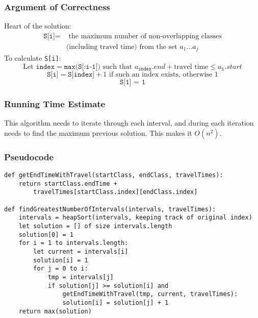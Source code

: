 \documentclass{math}
\begin{document}
\subsubsection*{Argument of Correctness}
Heart of the solution:
\begin{align*}
  \texttt{S[i]} =& \text{ the maximum number of non-overlapping classes} \\
  & \text{(including travel time) from the set } a_{1}\dots a_{j}
\end{align*}
To calculate \texttt{S[i]}:
\[ \text{Let } \texttt{index} = \texttt{max(S[:i-1])} \text{ such that }
  a_{\texttt{index}}.end + \text{travel time} \le a_{\texttt{i}}.start \]
\[ \texttt{S[i]} = \texttt{S[index]} + 1 \text{ if such an index exists,
  otherwise } 1 \]
\[ \texttt{S[1] = 1} \]

\subsubsection*{Running Time Estimate}
This algorithm needs to iterate through each interval, and during each
iteration needs to find the maximum previous solution. This makes it
\( O(n^2) \).

\subsubsection*{Pseudocode}
\begin{lstlisting}
def getEndTimeWithTravel(startClass, endClass, travelTimes):
    return startClass.endTime +
        travelTimes[startClass.index][endClass.index]

def findGreatestNumberOfIntervals(intervals, travelTimes):
    intervals = heapSort(intervals, keeping track of original index)
    let solution = [] of size intervals.length
    solution[0] = 1
    for i = 1 to intervals.length:
        let current = intervals[i]
        solution[i] = 1
        for j = 0 to i:
            tmp = intervals[j]
            if solution[j] >= solution[i] and
                getEndTimeWithTravel(tmp, current, travelTimes):
                solution[i] = solution[j] + 1
    return max(solution)
\end{lstlisting}
\end{document}
